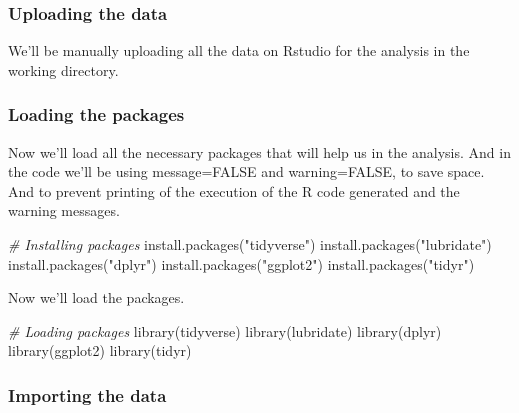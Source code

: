 \documentclass[
]{article}
\newenvironment{Shaded}{\begin{snugshade}}{\end{snugshade}}
\newcommand{\CommentTok}[1]{\textcolor[rgb]{0.56,0.35,0.01}{\textit{#1}}}
\newcommand{\FunctionTok}[1]{\textcolor[rgb]{0.00,0.00,0.00}{#1}}
\newcommand{\NormalTok}[1]{#1}
\newcommand{\StringTok}[1]{\textcolor[rgb]{0.31,0.60,0.02}{#1}}
\begin{document}
\hypertarget{section}{%
\subsubsection{}\label{section}}

\hypertarget{uploading-the-data}{%
\subsubsection{Uploading the data}\label{uploading-the-data}}

We'll be manually uploading all the data on Rstudio for the analysis in
the working directory.

\hypertarget{loading-the-packages}{%
\subsubsection{Loading the packages}\label{loading-the-packages}}

Now we'll load all the necessary packages that will help us in the
analysis. And in the code we'll be using message=FALSE and
warning=FALSE, to save space. And to prevent printing of the execution
of the R code generated and the warning messages.

\begin{Shaded}
\begin{Highlighting}[]
\CommentTok{\# Installing packages}
\FunctionTok{install.packages}\NormalTok{(}\StringTok{"tidyverse"}\NormalTok{)}
\FunctionTok{install.packages}\NormalTok{(}\StringTok{"lubridate"}\NormalTok{)}
\FunctionTok{install.packages}\NormalTok{(}\StringTok{"dplyr"}\NormalTok{)}
\FunctionTok{install.packages}\NormalTok{(}\StringTok{"ggplot2"}\NormalTok{)}
\FunctionTok{install.packages}\NormalTok{(}\StringTok{"tidyr"}\NormalTok{)}
\end{Highlighting}
\end{Shaded}

Now we'll load the packages.

\begin{Shaded}
\begin{Highlighting}[]
\CommentTok{\# Loading packages }
\FunctionTok{library}\NormalTok{(tidyverse)}
\FunctionTok{library}\NormalTok{(lubridate)}
\FunctionTok{library}\NormalTok{(dplyr)}
\FunctionTok{library}\NormalTok{(ggplot2)}
\FunctionTok{library}\NormalTok{(tidyr)}
\end{Highlighting}
\end{Shaded}

\hypertarget{importing-the-data}{%
\subsubsection{Importing the data}\label{importing-the-data}}
\end{document}
